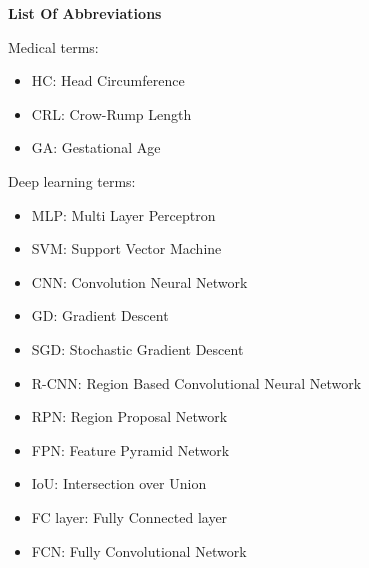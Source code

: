 %
%




\newpage	
\vspace{5cm} 

\begin{flushleft}
	{
		\fontsize{24pt}{1}\selectfont
		\textbf{List Of Abbreviations}
	}
\end{flushleft} 

Medical terms:
\begin{itemize}
	\item HC: Head Circumference
	\item CRL: Crow-Rump Length
	\item GA: Gestational Age
\end{itemize}

Deep learning terms:
\begin{itemize}
	\item MLP: Multi Layer Perceptron
	\item SVM: Support Vector Machine
	\item CNN: Convolution Neural Network
	\item GD: Gradient Descent
	\item SGD: Stochastic Gradient Descent
	\item R-CNN: Region Based Convolutional Neural Network
	\item RPN: Region Proposal Network
	\item FPN: Feature Pyramid Network
	\item IoU: Intersection over Union
	\item FC layer: Fully Connected layer
	\item FCN: Fully Convolutional Network
\end{itemize}
